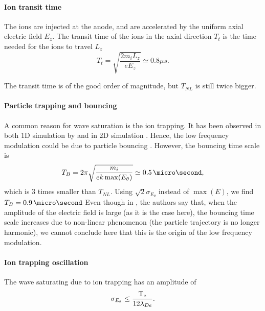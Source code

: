   
  \paragraph{Ion transit time\\}
    The ions are injected at the anode, and are accelerated by the uniform axial electric field $E_z$.
    The transit time of the ions in the axial direction $T_t$  is the time needed for the ions to travel $L_z$
    \begin{equation} \label{eq-transittime}
      T_{t} = \sqrt{\frac{2 m_i L_z}{e E_z}} \simeq 0.8 \mu s.
    \end{equation}
    
    The transit time is of the good  order of magnitude, but $T_{NL}$ is still twice bigger.
    
  \paragraph{Particle trapping and bouncing\\}
    A common reason for wave saturation is the ion trapping. 
    It has been observed in both \ac{1D} simulation by \citet{lafleur2016a} and in \ac{2D} simulation \citep{croes2017a}.
    Hence, the low frequency modulation could be due to particle bouncing \citep{belmont2013}.
    However, the bouncing time scale is 
    \begin{equation} \label{eq-TB}
      T_{B} = 2 \pi \sqrt{\frac{m_i}{e k \max(E_{\theta})} } \simeq 0.5 \,\micro\second,
    \end{equation}
    which is 3 times smaller than $T_{NL}$.
    Using $\sqrt{2} \sigma_{E_{\theta}}$ instead of $\max(E)$, we find $T_B = 0.9\,\micro\second$
    Even though in \citet{belmont2013}, the authors say that, when the amplitude of the electric field is large (as it is the case here), the bouncing time scale increases due to non-linear phenomenon (the particle trajectory is no longer harmonic), we cannot conclude here that this is the origin of the low frequency modulation.

  
  \paragraph{Ion trapping oscillation\\}
    The wave saturating due to ion trapping has an amplitude of \citep{boeuf2018}
     \begin{equation} \label{eq-iontropempl}
       \sigma_{E_{\theta}} \leq \frac{\mathrm{T_e}}{12 \lambda_{De}}.
     \end{equation}
    
